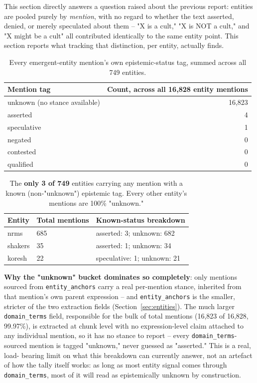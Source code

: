 \documentclass[11pt,a4paper]{article}
\begin{document}
This section directly answers a question raised about the previous
report: entities are pooled purely by \emph{mention}, with no regard to
whether the text asserted, denied, or merely speculated about them --
"X is a cult," "X is NOT a cult," and "X might be a cult" all
contributed identically to the same entity point. This section reports
what tracking that distinction, per entity, actually finds.

\begin{table}[h!]
\centering
\begin{tabular}{lr}
\toprule
Mention tag & Count, across all 16{,}828 entity mentions \\
\midrule
unknown (no stance available) & 16{,}823 \\
asserted & 4 \\
speculative & 1 \\
negated & 0 \\
contested & 0 \\
qualified & 0 \\
\bottomrule
\end{tabular}
\caption{Every emergent-entity mention's own epistemic-status tag,
summed across all 749 entities.}
\end{table}

\begin{table}[h!]
\centering
\begin{tabular}{lll}
\toprule
Entity & Total mentions & Known-status breakdown \\
\midrule
nrms & 685 & asserted: 3; unknown: 682 \\
shakers & 35 & asserted: 1; unknown: 34 \\
koresh & 22 & speculative: 1; unknown: 21 \\
\bottomrule
\end{tabular}
\caption{The \textbf{only 3 of 749} entities carrying any mention with a
known (non-"unknown") epistemic tag. Every other entity's mentions are
100\% "unknown."}
\end{table}

\textbf{Why the "unknown" bucket dominates so completely}: only mentions
sourced from \texttt{entity\_anchors} carry a real per-mention stance,
inherited from that mention's own parent expression -- and
\texttt{entity\_anchors} is the smaller, stricter of the two extraction
fields (Section~\ref{sec:entities}). The much larger
\texttt{domain\_terms} field, responsible for the bulk of total mentions
(16{,}823 of 16{,}828, 99.97\%), is extracted at chunk level with no
expression-level claim attached to any individual mention, so it has no
stance to report -- every \texttt{domain\_terms}-sourced mention is
tagged "unknown," never guessed as "asserted." This is a real, load-
bearing limit on what this breakdown can currently answer, not an
artefact of how the tally itself works: as long as most entity signal
comes through \texttt{domain\_terms}, most of it will read as
epistemically unknown by construction.
\end{document}
